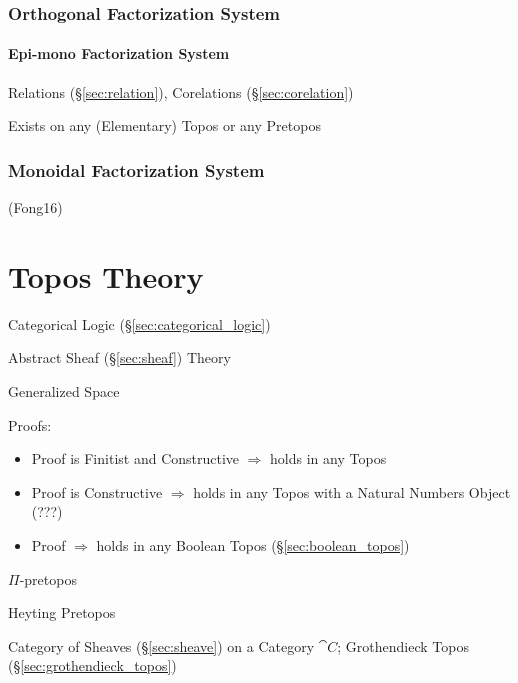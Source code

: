 \subsubsection{Orthogonal Factorization System}
\label{sec:orthogonal_factorization_system}

\paragraph{Epi-mono Factorization System}
\label{sec:epimono_factorization}\hfill

Relations (\S\ref{sec:relation}), Corelations (\S\ref{sec:corelation})

Exists on any (Elementary) Topos or any Pretopos %



\subsubsection{Monoidal Factorization System}
\label{sec:monoidal_factorization_system}

(Fong16)



\section{Topos Theory}\label{sec:topos_theory}

Categorical Logic (\S\ref{sec:categorical_logic})

Abstract Sheaf (\S\ref{sec:sheaf}) Theory

Generalized Space

Proofs:
\begin{itemize}
  \item Proof is Finitist and Constructive $\Rightarrow$ holds in any
    Topos
  \item Proof is Constructive $\Rightarrow$ holds in any Topos with a
    Natural Numbers Object (???)
  \item Proof $\Rightarrow$ holds in any Boolean Topos
    (\S\ref{sec:boolean_topos})
\end{itemize}

$\Pi$-pretopos

Heyting Pretopos

Category of Sheaves (\S\ref{sec:sheave}) on a Category $\cat{C}$;
Grothendieck Topos (\S\ref{sec:grothendieck_topos})

